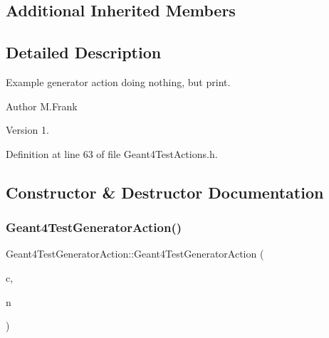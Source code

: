 \subsection*{Additional Inherited Members}


\subsection{Detailed Description}
Example generator action doing nothing, but print. 

\begin{DoxyAuthor}{Author}
M.\+Frank 
\end{DoxyAuthor}
\begin{DoxyVersion}{Version}
1. 
\end{DoxyVersion}


Definition at line 63 of file Geant4\+Test\+Actions.\+h.



\subsection{Constructor \& Destructor Documentation}
\hypertarget{class_d_d4hep_1_1_simulation_1_1_test_1_1_geant4_test_generator_action_a7bbaab8b38a9771b99190c270fedb637}{}\label{class_d_d4hep_1_1_simulation_1_1_test_1_1_geant4_test_generator_action_a7bbaab8b38a9771b99190c270fedb637} 
\subsubsection{\texorpdfstring{Geant4\+Test\+Generator\+Action()}{Geant4TestGeneratorAction()}}
{\footnotesize\ttfamily Geant4\+Test\+Generator\+Action\+::\+Geant4\+Test\+Generator\+Action (\begin{DoxyParamCaption}\item[{\hyperlink{class_d_d4hep_1_1_simulation_1_1_geant4_context}{Geant4\+Context} $\ast$}]{c,  }\item[{const std\+::string \&}]{n }\end{DoxyParamCaption})}



